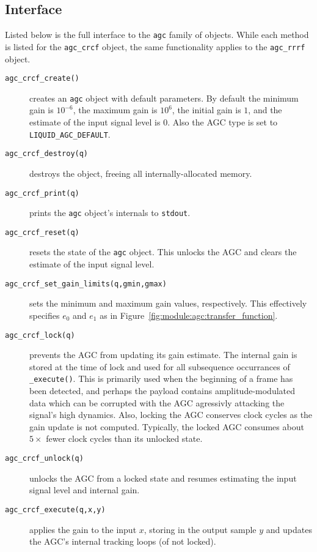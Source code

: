 \subsection{Interface}
\label{module:agc:squelch:interface}
Listed below is the full interface to the {\tt agc} family of objects.
While each method is listed for the {\tt agc\_crcf} object, the same
functionality applies to the {\tt agc\_rrrf} object.
\begin{description}
\item[{\tt agc\_crcf\_create()}]
    creates an {\tt agc} object with default parameters.
    By default the minimum gain is $10^{-6}$, the maximum gain is $10^6$, the
    initial gain is $1$, and the estimate of the input signal level is $0$.
    Also the AGC type is set to {\tt LIQUID\_AGC\_DEFAULT}.
\item[{\tt agc\_crcf\_destroy(q)}]
    destroys the object, freeing all internally-allocated memory.
\item[{\tt agc\_crcf\_print(q)}]
    prints the {\tt agc} object's internals to {\tt stdout}.
\item[{\tt agc\_crcf\_reset(q)}]
    resets the state of the {\tt agc} object.
    This unlocks the AGC and clears the estimate of the input signal level.
\item[{\tt agc\_crcf\_set\_gain\_limits(q,gmin,gmax)}]
    sets the minimum and maximum gain values, respectively.
    This effectively specifies $e_0$ and $e_1$ as in
    Figure~\ref{fig:module:agc:transfer_function}.
\item[{\tt agc\_crcf\_lock(q)}]
    prevents the AGC from updating its gain estimate.
    The internal gain is stored at the time of lock and used for all
    subsequence occurrances of {\tt \_execute()}.
    This is primarily used when the beginning of a frame has been detected,
    and perhaps the payload contains amplitude-modulated data which can be
    corrupted with the AGC agressivly attacking the signal's high
    dynamics.
    Also, locking the AGC conserves clock cycles as the gain update is
    not computed.
    Typically, the locked AGC consumes about $5\times$ fewer clock
    cycles than its unlocked state.
\item[{\tt agc\_crcf\_unlock(q)}]
    unlocks the AGC from a locked state and resumes estimating the input
    signal level and internal gain.
\item[{\tt agc\_crcf\_execute(q,x,y)}]
    applies the gain to the input $x$, storing in the output sample $y$
    and updates the AGC's internal tracking loops (of not locked).

\end{description}
